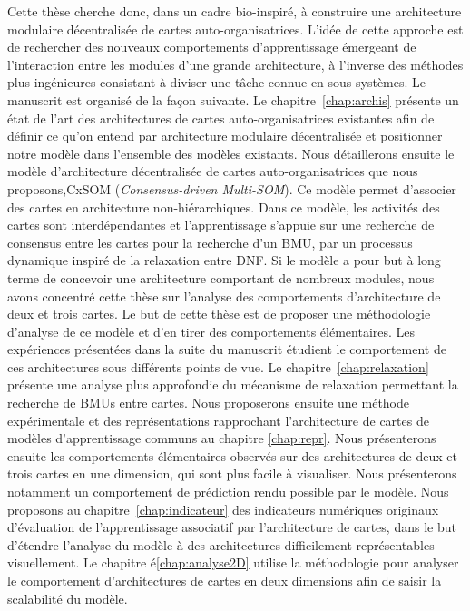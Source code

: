 Cette thèse cherche donc, dans un cadre bio-inspiré, à construire une architecture modulaire décentralisée de cartes auto-organisatrices. L'idée de cette approche est de rechercher des nouveaux comportements d'apprentissage émergeant de l'interaction entre les modules d'une grande architecture, à l'inverse des méthodes plus ingénieures consistant à diviser une tâche connue en sous-systèmes.
Le manuscrit est organisé de la façon suivante.
Le chapitre~\ref{chap:archis} présente un état de l'art des architectures de cartes auto-organisatrices existantes afin de définir ce qu'on entend par architecture modulaire décentralisée et positionner notre modèle dans l'ensemble des modèles existants.
Nous détaillerons ensuite le modèle d'architecture décentralisée de cartes auto-organisatrices que nous proposons,CxSOM (\emph{Consensus-driven Multi-SOM}).
Ce modèle permet d'associer des cartes en architecture non-hiérarchiques. Dans ce modèle, les activités des cartes sont interdépendantes et l'apprentissage s'appuie sur une recherche de consensus entre les cartes pour la recherche d'un BMU, par un processus dynamique inspiré de la relaxation entre DNF.
Si le modèle a pour but à long terme de concevoir une architecture comportant de nombreux modules, nous avons concentré cette thèse sur l'analyse des comportements d'architecture de deux et trois cartes.
Le but de cette thèse est de proposer une méthodologie d'analyse de ce modèle et d'en tirer des comportements élémentaires.
Les expériences présentées dans la suite du manuscrit étudient le comportement de ces architectures sous différents points de vue.
Le chapitre~\ref{chap:relaxation} présente une analyse plus approfondie du mécanisme de relaxation permettant la recherche de BMUs entre cartes.
Nous proposerons ensuite une méthode expérimentale et des représentations rapprochant l'architecture de cartes de modèles d'apprentissage communs au chapitre \ref{chap:repr}.
Nous présenterons ensuite les comportements élémentaires observés sur des architectures de deux et trois cartes en une dimension, qui sont plus facile à visualiser. 
Nous présenterons notamment un comportement de prédiction rendu possible par le modèle.
Nous proposons au chapitre~\ref{chap:indicateur} des indicateurs numériques originaux d'évaluation de l'apprentissage associatif par l'architecture de cartes, dans le but d'étendre l'analyse du modèle à des architectures difficilement représentables visuellement.
Le chapitre é\ref{chap:analyse2D} utilise la méthodologie pour analyser le comportement d'architectures de cartes en deux dimensions afin de saisir la scalabilité du modèle.

